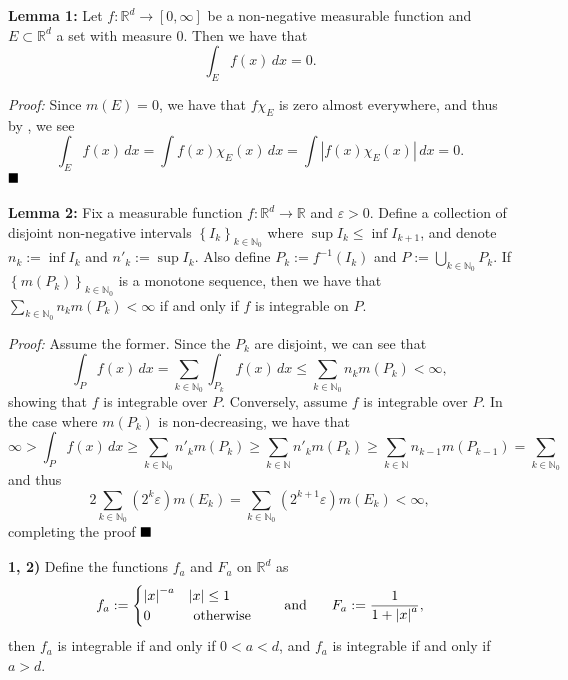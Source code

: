 \documentclass[12pt]{article}
\newcommand{\N}{\ensuremath{\mathbb{N}}}
\newcommand{\R}{\ensuremath{\mathbb{R}}}
\newcommand{\e}{\ensuremath{\varepsilon}}
\newcommand{\braceb}[1]{\left\{#1\right\}}
\newcommand{\vertb}[1]{\left\vert#1\right\vert}
\newcommand{\proof}{\textit{Proof: }}
\newcommand{\done}{\ensuremath{\strut\hfill\blacksquare}}
\renewcommand{\t}[1]{\text{ #1 }}
\begin{document}
\pagestyle{fancy}

\setlength{\parindent}{0in}
\setlength{\parskip}{0.1in}

\textbf{Lemma 1:}
Let \( f : \R^d \to [0, \infty] \) be a non-negative measurable function and
\( E \subset \R^d \) a set with measure 0.
Then we have that
\[
	\int_E f(x) \, dx = 0.
\]

\proof
Since \( m(E) = 0 \), we have that \( f\chi_E \) is zero almost everywhere,
and thus by \cite{AlmostEverywhere}, we see
\[
	\int_E f(x) \, dx
	= \int f(x)\chi_E(x) \, dx
	= \int \vertb{f(x)\chi_E(x)} \, dx
	= 0.
\] 
\done

\textbf{Lemma 2:}
Fix a measurable function \( f : \R^d \to \R \) and \( \e > 0 \).
Define a collection of disjoint non-negative intervals
\( \braceb{I_k}_{k \in \N_0} \) where \( \sup I_k \leq \inf I_{k + 1} \), and
denote \( n_k := \inf I_k \) and \( n'_k := \sup I_k \).
Also define \( P_k := f^{-1}(I_k) \) and \( P := \bigcup_{k \in \N_0} P_k \).
If \( \braceb{m(P_k)}_{k \in \N_0} \) is a monotone sequence, then we have that
\( \sum_{k \in \N_0} n_k m(P_k) < \infty \) if and only if \( f \) is
integrable on \( P \).

\proof
Assume the former.
Since the \( P_k \) are disjoint, we can see that
\[
	\int_{P} f(x) \, dx
	= \sum_{k \in \N_0} \int_{P_k} f(x) \, dx
	\leq \sum_{k \in \N_0} n_k m(P_k)
	< \infty,
\]
showing that \( f \) is integrable over \( P \).
Conversely, assume \( f \) is integrable over \( P \).
In the case where \( m(P_k) \) is non-decreasing, we have that
\[
	\infty
	> \int_P f(x) \, dx
	\geq \sum_{k \in \N_0} n'_k m(P_k)
	\geq \sum_{k \in \N} n'_k m(P_k)
	\geq \sum_{k \in \N} n_{k - 1} m(P_{k - 1})
	= \sum_{k \in \N_0}
	
\]
and thus
\[
	2\sum_{k \in \N_0} (2^k\e)m(E_k)
	= \sum_{k \in \N_0} (2^{k + 1}\e)m(E_k)
	< \infty,
\]
completing the proof
\done

\textbf{1, 2)}
Define the functions \( f_a \) and \( F_a \) on \( \R^d \) as
\[
	f_a := \begin{cases}
		\vertb{x}^{-a} & \vertb{x} \leq 1 \\
		0              & \t{otherwise}
	\end{cases}
	\hspace{0.2in}
	\t{and}
	\hspace{0.2in}
	F_a := \frac{1}{1 + \vertb{x}^a},
\]
then \( f_a \) is integrable if and only if \( 0 < a < d \), and \( f_a \) is
integrable if and only if \( a > d \).
\end{document}
